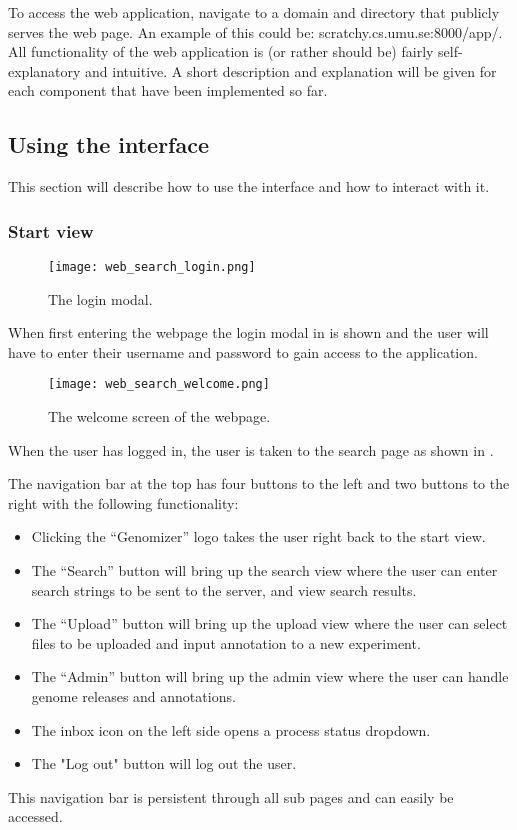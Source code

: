 To access the web application, navigate to a domain and directory that publicly serves the web page. An example of this could be: scratchy.cs.umu.se:8000/app/.
All functionality of the web application is (or rather should be) fairly self-explanatory and intuitive. A short description and explanation will be given for each component that have been implemented so far.
\subsection{Using the interface}
This section will describe how to use the interface and how to interact with it.
\subsubsection{Start view}
\begin{figure}[h]
\centering
\texttt{[image: web\_search\_login.png]}
\caption{\label{fig:web_search_login} The login modal.}
\end{figure}
When first entering the webpage the login modal in  is shown and the user will have to enter their username and password to gain access to the application.

\begin{figure}[h]
\centering
\texttt{[image: web\_search\_welcome.png]}
\caption{\label{fig:web_search_welcome} The welcome screen of the webpage.}
\end{figure}

When the user has logged in, the user is taken to the search page as shown in .

The navigation bar at the top has four buttons to the left and two buttons to the right with the following functionality:
\begin{itemize}
	\item Clicking the “Genomizer” logo takes the user right back to the start view.
	\item The “Search” button will bring up the search view where the user can enter search strings to be sent to the server, and view search results.
	\item The “Upload” button will bring up the upload view where the user can select files to be uploaded and input annotation to a new experiment.
	\item The “Admin” button will bring up the admin view where the user can handle genome releases and annotations.
    \item The inbox icon on the left side opens a process status dropdown.
    \item The "Log out" button will log out the user.
\end{itemize}
This navigation bar is persistent through all sub pages and can easily be accessed.


